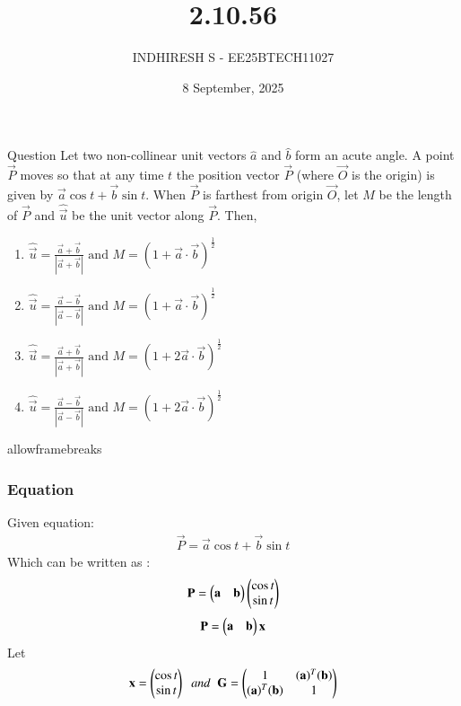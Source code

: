 \documentclass{beamer}
\title %
{2.10.56}
\date{8 September, 2025}
\author %
{INDHIRESH S - EE25BTECH11027}
\begin{document}
\frame{\titlepage}
\begin{frame}{Question}
Let two non-collinear unit vectors $\hat{a}$ and $\hat{b}$ form an acute angle. A point $\vec{P}$ moves so that at any time $t$ the position vector $\Vec{P}$ (where $\vec{O}$ is the origin) is given by $\Vec{a}\cos{t} + \vec{b}\sin{t}$. When $\vec{P}$ is farthest from origin $\vec{O}$, let $M$ be the length of $\Vec{P}$ and $\hat{\vec{u}}$ be the unit vector along $\Vec{P}$. Then,

    \begin{enumerate}
	    \item $\hat{\vec{u}} = \frac{\Vec{a}+\vec{b}}{|\Vec{a}+\vec{b}|} \text{ and } M = (1+\Vec{a} \cdot \vec{b})^{\frac{1}{2}}$
    	\item $\hat{\vec{u}} = \frac{\Vec{a}-\vec{b}}{|\Vec{a}-\vec{b}|} \text{ and } M = (1+\Vec{a} \cdot \vec{b})^{\frac{1}{2}}$
    	\item $\hat{\vec{u}} = \frac{\Vec{a}+\vec{b}}{|\Vec{a}+\vec{b}|} \text{ and } M = (1+2\Vec{a} \cdot \vec{b})^{\frac{1}{2}}$
    	\item $\hat{\vec{u}} = \frac{\Vec{a}-\vec{b}}{|\Vec{a}-\vec{b}|} \text{ and } M = (1+2\Vec{a} \cdot \vec{b})^{\frac{1}{2}}$
    \end{enumerate}
    
\end{frame}
\begin{frame}{allowframebreaks}
\frametitle{Equation}

    \centering
    
    \label{tab:parameters}
Given equation:
\begin{align}
     \Vec{P}=\vec{a}\cos{t} + \vec{b}\sin{t}
\end{align}
Which can be written as :
\begin{align}
    \Vec{P}=\myvec{\vec{a}&\vec{b}}\myvec{\cos{t}\\\sin{t}}
\end{align}
\begin{align}
    \Vec{P}=\myvec{\Vec{a}&\Vec{b}}\Vec{x}
\end{align}
Let
\begin{align}
    \Vec{x}= \myvec{\cos{t} \\ \sin{t}} \;\;and\;\;\vec{G}=\myvec{1&(\Vec{a})^T(\Vec{b})\\(\Vec{a})^T(\Vec{b})&1}
\end{align}

   
\end{frame}
\end{document}
